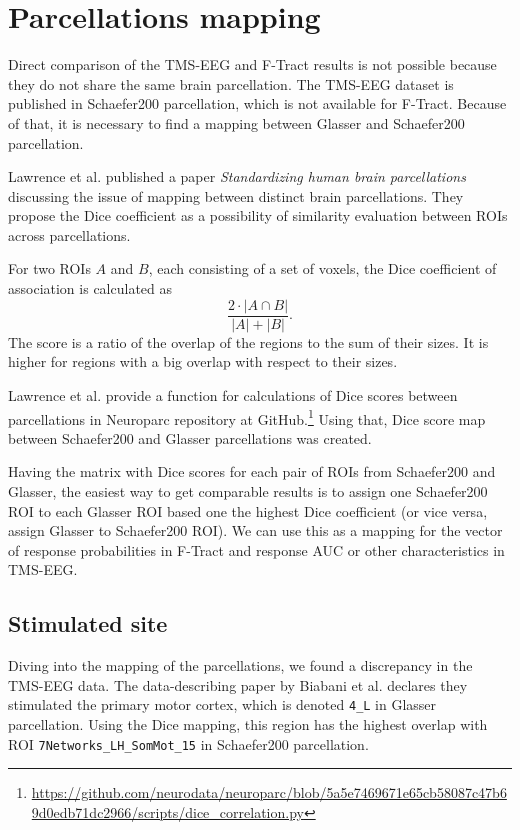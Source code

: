 \section{Parcellations mapping}\label{sec:dice}

Direct comparison of the TMS-EEG and F-Tract results is not possible because they do not share the same brain parcellation. The TMS-EEG dataset is published in Schaefer200 parcellation, which is not available for F-Tract. Because of that, it is necessary to find a mapping between Glasser and Schaefer200 parcellation.

Lawrence et al. published a paper \textit{Standardizing human brain parcellations} \cite{lawrence_standardizing_2021} discussing the issue of mapping between distinct brain parcellations. They propose the Dice coefficient \cite{dice_measures_1945} as a possibility of similarity evaluation between ROIs across parcellations. 

For two ROIs $A$ and $B$, each consisting of a set of voxels, the Dice coefficient of association is calculated as  
$$
\frac{2 \cdot |A\cap B|}{|A|+|B|}.
$$
The score is a ratio of the overlap of the regions to the sum of their sizes. It is higher for regions with a big overlap with respect to their sizes.

Lawrence et al. provide a function for calculations of Dice scores between parcellations in Neuroparc repository at GitHub.\footnote{\url{https://github.com/neurodata/neuroparc/blob/5a5e7469671e65cb58087c47b69d0edb71dc2966/scripts/dice_correlation.py}} Using that, Dice score map between Schaefer200 and Glasser parcellations was created.

Having the matrix with Dice scores for each pair of ROIs from Schaefer200 and Glasser, the easiest way to get comparable results is to assign one Schaefer200 ROI to each Glasser ROI based one the highest Dice coefficient (or vice versa, assign Glasser to Schaefer200 ROI). We can use this as a mapping for the vector of response probabilities in F-Tract and response AUC or other characteristics in TMS-EEG. 

\subsection{Stimulated site}\label{sec:parcellations-mapping-stimulated_roi}

Diving into the mapping of the parcellations, we found a discrepancy in the TMS-EEG data. The data-describing paper by Biabani et al. \cite{biabani_characterizing_2019} declares they stimulated the primary motor cortex, which is denoted \texttt{4\_L} in Glasser parcellation. Using the Dice mapping, this region has the highest overlap with ROI \texttt{7Networks\_LH\_SomMot\_15} in Schaefer200 parcellation. 

